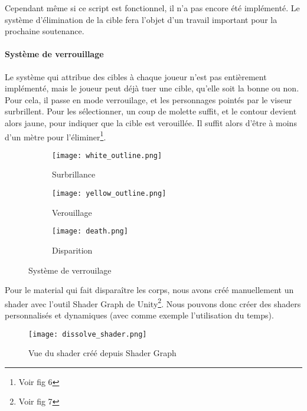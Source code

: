             Cependant même si ce script est fonctionnel, il n'a pas encore été implémenté. 
            Le système d'élimination de la cible fera l'objet d'un travail important pour la prochaine soutenance.
        
        
        \paragraph{Système de verrouillage}
            
            Le système qui attribue des cibles à chaque joueur n'est pas entièrement implémenté, mais le joueur peut déjà tuer une cible, qu'elle soit la bonne ou non.
            Pour cela, il passe en mode verrouilage, et les personnages pointés par le viseur surbrillent.
            Pour les sélectionner, un coup de molette suffit, et le contour devient alors jaune, pour indiquer que la cible est verouillée.
            Il suffit alors d'être à moins d'un mètre pour l'éliminer\footnote{Voir fig 6}.

            \begin{figure}[hbt!]
                \centering
                \begin{subfigure}[b]{0.3\textwidth}
                    \texttt{[image: white\_outline.png]} 
                    \caption{Surbrillance}
                \end{subfigure}
                \hspace{150pt}
                \begin{subfigure}[b]{0.3\textwidth}
                    \texttt{[image: yellow\_outline.png]} 
                    \caption{Verouillage}
                \end{subfigure}

                \begin{subfigure}[b]{0.3\textwidth}
                    \texttt{[image: death.png]} 
                    \caption{Disparition}
                \end{subfigure}
                \caption{Système de verrouilage}
            \end{figure}
			\FloatBarrier

            Pour le material qui fait disparaître les corps, nous avons créé manuellement un shader avec l'outil Shader Graph de Unity\footnote{Voir fig 7}.
            Nous pouvons donc créer des shaders personnalisés et dynamiques (avec comme exemple l'utilisation du temps).

            \begin{figure}[hbt!]
                \centering
                \texttt{[image: dissolve\_shader.png]}
                \caption{Vue du shader créé depuis Shader Graph}
            \end{figure}
			\FloatBarrier


